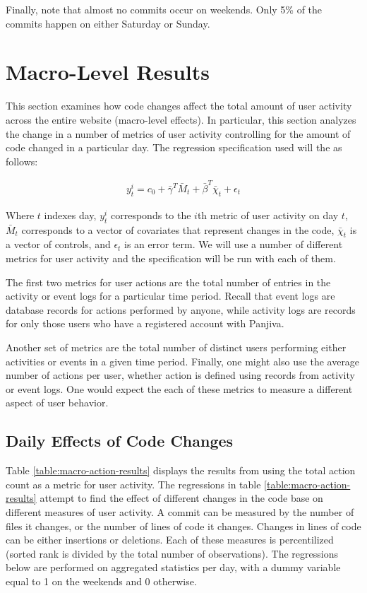 \documentclass[10pt]{report}
\begin{document}
Finally, note that almost no commits occur on weekends. Only 5\% of the commits happen on either Saturday or Sunday.

\section{Macro-Level Results}

This section examines how code changes affect the total amount of user activity across the entire website (macro-level effects). In particular, this section analyzes the change in a number of metrics of user activity controlling for the amount of code changed in a particular day. The regression specification used will the as follows:

\begin{eqnarray}
y^i_{t} = c_0 + \bar{\gamma}^T \bar{M}_t + \bar{\beta}^T \bar{\chi}_t + \epsilon_t
\end{eqnarray}

Where $t$ indexes day, $y^i_t$ corresponds to the $i$th metric of user activity on day $t$, $\bar{M}_t$ corresponds to a vector of covariates that represent changes in the code, $\bar{\chi}_t$ is a vector of controls, and $\epsilon_t$ is an error term. We will use a number of different metrics for user activity and the specification will be run with each of them. 

The first two metrics for user actions are the total number of entries in the activity or event logs for a particular time period. Recall that event logs are database records for actions performed by anyone, while activity logs are records for only those users who have a registered account with Panjiva.

Another set of metrics are the total number of distinct users performing either activities or events in a given time period. Finally, one might also use the average number of actions per user, whether action is defined using records from activity or event logs. One would expect the each of these metrics to measure a different aspect of user behavior. 

\subsection{Daily Effects of Code Changes}

Table \ref{table:macro-action-results} displays the results from using the total action count as a metric for user activity. The regressions in table \ref{table:macro-action-results} attempt to find the effect of different changes in the code base on different measures of user activity. A commit can be measured by the number of files it changes, or the number of lines of code it changes. Changes in lines of code can be either insertions or deletions. Each of these measures is percentilized (sorted rank is divided by the total number of observations). The regressions below are performed on aggregated statistics per day, with a dummy variable equal to 1 on the weekends and 0 otherwise.  
\end{document}
